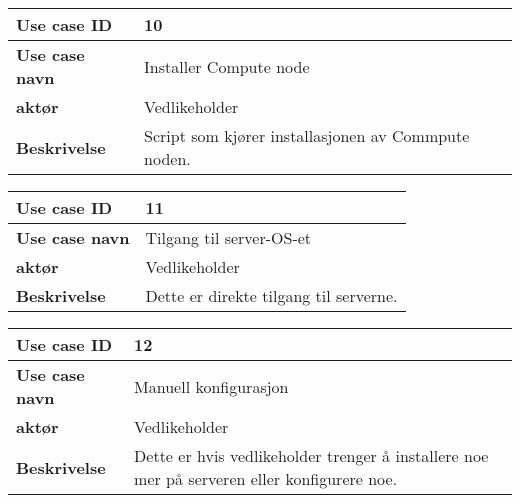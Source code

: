 \begin{table}[H]
	\begin{tabular}[Figur 2]{| p{2cm} | p{9cm} |}
		\hline \rowcolor{lightgray} \textbf{Use case ID} & 10 \\
		\hline \rowcolor{darkgray} \textbf{Use case navn} & Installer Compute node \\
		\hline \rowcolor{lightgray} \textbf{aktør} & Vedlikeholder \\
		\hline \rowcolor{darkgray} \textbf{Beskrivelse} & Script som kjører installasjonen av Commpute noden. \\
		\hline	
	\end{tabular}
\end{table}

\begin{table}[H]
	\begin{tabular}[Figur 2]{| p{2cm} | p{9cm} |}
		\hline \rowcolor{lightgray} \textbf{Use case ID} & 11 \\
		\hline \rowcolor{darkgray} \textbf{Use case navn} & Tilgang til server-OS-et \\
		\hline \rowcolor{lightgray} \textbf{aktør} & Vedlikeholder \\
		\hline \rowcolor{darkgray} \textbf{Beskrivelse} & Dette er direkte tilgang til serverne. \\
		\hline
	\end{tabular}
\end{table}

\begin{table}[H]
	\begin{tabular}[Figur 2]{| p{2cm} | p{9cm} |}
		\hline \rowcolor{lightgray} \textbf{Use case ID} & 12 \\
		\hline \rowcolor{darkgray} \textbf{Use case navn} & Manuell konfigurasjon \\
		\hline \rowcolor{lightgray} \textbf{aktør} & Vedlikeholder \\
		\hline \rowcolor{darkgray} \textbf{Beskrivelse} & Dette er hvis vedlikeholder trenger å installere noe mer på serveren eller konfigurere noe. \\
		\hline
	\end{tabular}
\end{table}